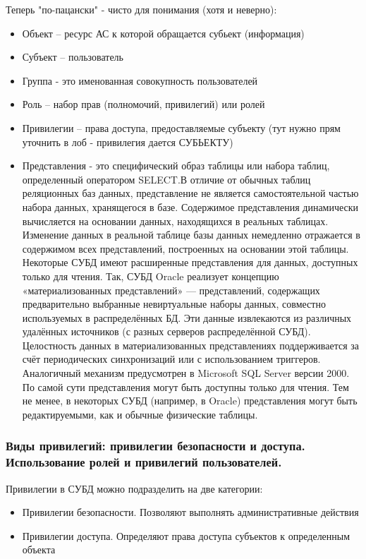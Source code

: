 Теперь "по-пацански" - чисто для понимания (хотя и неверно):
\begin{itemize}
    \item Объект – ресурс АС к которой обращается субьект (информация)
    \item Субъект – пользователь
    \item Группа - это именованная совокупность пользователей
    \item Роль – набор прав (полномочий, привилегий) или ролей
    \item Привилегии – права доступа, предоставляемые субъекту (тут нужно прям уточнить в лоб -
        привилегия дается СУБЬЕКТУ)
    \item Представления - это специфический образ таблицы или набора таблиц, определенный
        оператором SELECT.В отличие от обычных таблиц реляционных баз данных, представление не
        является самостоятельной частью набора данных, хранящегося в базе. Содержимое представления
        динамически вычисляется на основании данных, находящихся в реальных таблицах. Изменение
        данных в реальной таблице базы данных немедленно отражается в содержимом всех
        представлений, построенных на основании этой таблицы. Некоторые СУБД имеют расширенные
        представления для данных, доступных только для чтения. Так, СУБД Oracle реализует концепцию
        «материализованных представлений» — представлений, содержащих предварительно выбранные
        невиртуальные наборы данных, совместно используемых в распределённых БД. Эти данные
        извлекаются из различных удалённых источников (с разных серверов распределённой СУБД).
        Целостность данных в материализованных представлениях поддерживается за счёт периодических
        синхронизаций или с использованием триггеров. Аналогичный механизм предусмотрен в Microsoft
        SQL Server версии 2000. По самой сути представления могут быть доступны только для чтения.
        Тем не менее, в некоторых СУБД (например, в Oracle) представления могут быть редактируемыми,
        как и обычные физические таблицы.
\end{itemize}


\subsubsection{Виды привилегий: привилегии безопасности и доступа. Использование ролей и привилегий пользователей.}

Привилегии в СУБД можно подразделить на две категории:
\begin{itemize}
    \item Привилегии безопасности. Позволяют выполнять административные действия
    \item Привилегии доступа. Определяют права доступа субъектов к определенным объекта
\end{itemize}


